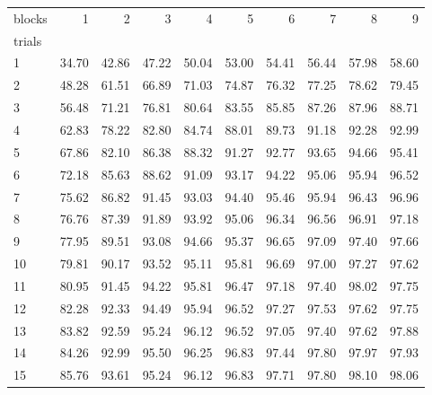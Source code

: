 \begin{tabularx}{\textwidth}{@{}Xrrrrrrrrr@{}}
\toprule
blocks & 1 & 2 & 3 & 4 & 5 & 6 & 7 & 8 & 9 \\
trials &  &  &  &  &  &  &  &  &  \\
\midrule
1 & 34.70 & 42.86 & 47.22 & 50.04 & 53.00 & 54.41 & 56.44 & 57.98 & 58.60 \\
2 & 48.28 & 61.51 & 66.89 & 71.03 & 74.87 & 76.32 & 77.25 & 78.62 & 79.45 \\
3 & 56.48 & 71.21 & 76.81 & 80.64 & 83.55 & 85.85 & 87.26 & 87.96 & 88.71 \\
4 & 62.83 & 78.22 & 82.80 & 84.74 & 88.01 & 89.73 & 91.18 & 92.28 & 92.99 \\
5 & 67.86 & 82.10 & 86.38 & 88.32 & 91.27 & 92.77 & 93.65 & 94.66 & 95.41 \\
6 & 72.18 & 85.63 & 88.62 & 91.09 & 93.17 & 94.22 & 95.06 & 95.94 & 96.52 \\
7 & 75.62 & 86.82 & 91.45 & 93.03 & 94.40 & 95.46 & 95.94 & 96.43 & 96.96 \\
8 & 76.76 & 87.39 & 91.89 & 93.92 & 95.06 & 96.34 & 96.56 & 96.91 & 97.18 \\
9 & 77.95 & 89.51 & 93.08 & 94.66 & 95.37 & 96.65 & 97.09 & 97.40 & 97.66 \\
10 & 79.81 & 90.17 & 93.52 & 95.11 & 95.81 & 96.69 & 97.00 & 97.27 & 97.62 \\
11 & 80.95 & 91.45 & 94.22 & 95.81 & 96.47 & 97.18 & 97.40 & 98.02 & 97.75 \\
12 & 82.28 & 92.33 & 94.49 & 95.94 & 96.52 & 97.27 & 97.53 & 97.62 & 97.75 \\
13 & 83.82 & 92.59 & 95.24 & 96.12 & 96.52 & 97.05 & 97.40 & 97.62 & 97.88 \\
14 & 84.26 & 92.99 & 95.50 & 96.25 & 96.83 & 97.44 & 97.80 & 97.97 & 97.93 \\
15 & 85.76 & 93.61 & 95.24 & 96.12 & 96.83 & 97.71 & 97.80 & 98.10 & 98.06 \\
\bottomrule
\end{tabularx}
